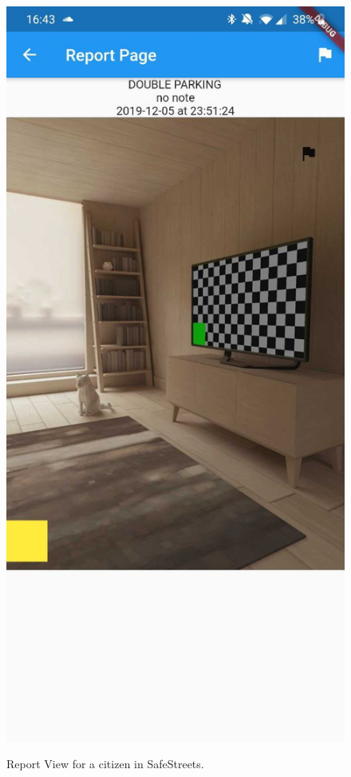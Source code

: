 \documentclass[../RASD.tex]{subfiles}
\begin{document}
    \begin{figure}[H]
        \centering
        \includegraphics[scale = 0.2]{assets/app_screenshots/report.jpg}\\[1.6 cm]
        \caption[\textit{View Report Citizen} Screenshot]{Report View for a citizen in SafeStreets.}
    \end{figure}
\end{document}
